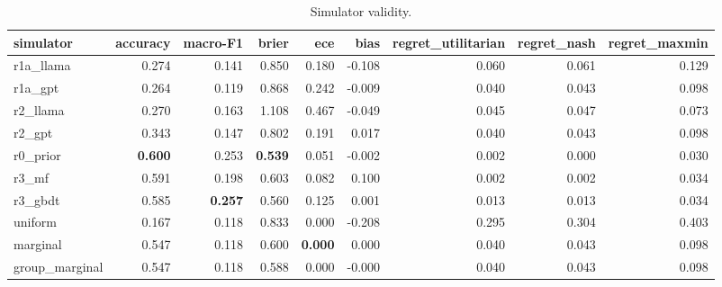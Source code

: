 \begin{table}[t]
\centering
\small
\begin{tabular}{lrrrrrrrr}
\toprule
simulator & accuracy & macro-F1 & brier & ece & bias & regret\_utilitarian & regret\_nash & regret\_maxmin \\
\midrule
r1a\_llama & 0.274 & 0.141 & 0.850 & 0.180 & -0.108 & 0.060 & 0.061 & 0.129 \\
r1a\_gpt & 0.264 & 0.119 & 0.868 & 0.242 & -0.009 & 0.040 & 0.043 & 0.098 \\
r2\_llama & 0.270 & 0.163 & 1.108 & 0.467 & -0.049 & 0.045 & 0.047 & 0.073 \\
r2\_gpt & 0.343 & 0.147 & 0.802 & 0.191 & 0.017 & 0.040 & 0.043 & 0.098 \\
r0\_prior & \textbf{0.600} & 0.253 & \textbf{0.539} & 0.051 & -0.002 & 0.002 & 0.000 & 0.030 \\
r3\_mf & 0.591 & 0.198 & 0.603 & 0.082 & 0.100 & 0.002 & 0.002 & 0.034 \\
r3\_gbdt & 0.585 & \textbf{0.257} & 0.560 & 0.125 & 0.001 & 0.013 & 0.013 & 0.034 \\
uniform & 0.167 & 0.118 & 0.833 & 0.000 & -0.208 & 0.295 & 0.304 & 0.403 \\
marginal & 0.547 & 0.118 & 0.600 & \textbf{0.000} & 0.000 & 0.040 & 0.043 & 0.098 \\
group\_marginal & 0.547 & 0.118 & 0.588 & 0.000 & -0.000 & 0.040 & 0.043 & 0.098 \\
\bottomrule
\end{tabular}
\caption{Simulator validity.}
\label{tab:simulators}
\end{table}
